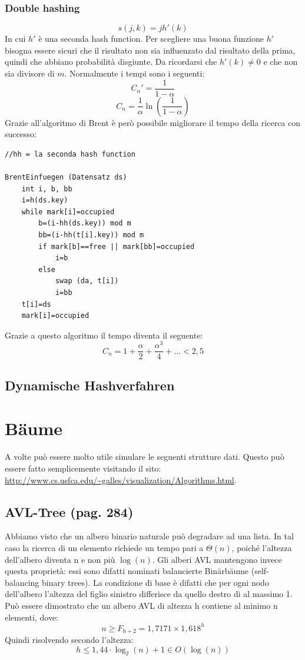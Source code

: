 \documentclass[a4paper]{book}
\newcommand{\lstIndent}{4}
\begin{document}
\subsection{Double hashing}
$$s(j,k)=jh'(k) $$
In cui $h'$ è una seconda hash function. Per scegliere una buona funzione $h'$ bisogna essere sicuri che il risultato non sia influenzato dal risultato della prima, quindi che abbiano probabilità disgiunte. Da ricordarsi che $h'(k) \neq 0$ e che non sia divisore di $m$. Normalmente i tempi sono i seguenti:
$$ C_n '= \frac{1}{1-\alpha} $$
$$ C_n = \frac{1}{\alpha} \ln \left(\frac{1}{1-\alpha}\right)$$
Grazie all'algoritmo di Brent è però possibile migliorare il tempo della ricerca con successo:
\begin{lstlisting}[tabsize=\lstIndent]
//hh = la seconda hash function

BrentEinfuegen (Datensatz ds)
	int i, b, bb
	i=h(ds.key)
	while mark[i]=occupied
		b=(i-hh(ds.key)) mod m
		bb=(i-hh(t[i].key)) mod m
		if mark[b]==free || mark[bb]=occupied
			i=b
		else
			swap (da, t[i])
			i=bb
	t[i]=ds
	mark[i]=occupied			
\end{lstlisting}
Grazie a questo algoritmo il tempo diventa il seguente:
$$C_n = 1+\frac{\alpha}{2}+\frac{\alpha ^3}{4}+... <2,5$$
\section{Dynamische Hashverfahren}
\chapter{Bäume}
A volte può essere molto utile simulare le seguenti strutture dati. Questo può essere fatto semplicemente visitando il sito: \url{http://www.cs.usfca.edu/~galles/visualization/Algorithms.html}.
\section{AVL-Tree (pag. 284)}
Abbiamo visto che un albero binario naturale può degradare ad una lista. In tal caso la ricerca di un elemento richiede un tempo pari a $\Theta (n)$, poiché l'altezza dell'albero diventa n e non più $\log(n)$. Gli alberi AVL mantengono invece questa proprietà: essi sono difatti nominati balancierte Binärbäume (self-balancing binary trees). La condizione di base è difatti che per ogni nodo dell'albero l'altezza del figlio sinistro differisce da quello destro di al massimo 1. Può essere dimostrato che un albero AVL di altezza h contiene al minimo n elementi, dove:
$$ n\geq F_{h+2} = 1,7171\times 1,618^h$$
Quindi risolvendo secondo l'altezza:
$$ h\leq 1,44 \cdot\log_2 (n)+1 \in O(\log(n))$$
\end{document}
